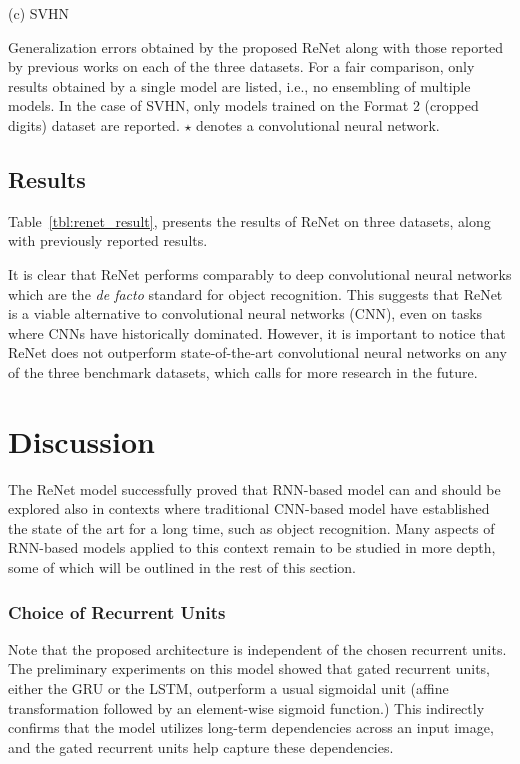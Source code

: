 \begin{table}[t]
\begin{minipage}{0.45\textwidth}
            \vspace{2mm}
            (c) SVHN
        \end{minipage}
        \hfill
        \begin{minipage}{0.51\textwidth}
            \caption{Generalization errors obtained by the proposed ReNet along
                with those reported by previous works on each of the three
                datasets. For a fair comparison, only results obtained by a
                single model are listed, i.e., no ensembling of multiple
                models. In the case of SVHN, only models trained on the Format
                2 (cropped digits) dataset are reported. $\star$ denotes a
                convolutional neural network.}
            \label{tbl:renet_result}
        \end{minipage}
    \end{table}

\subsection{Results}\label{sec:renet_results}

Table~\ref{tbl:renet_result}, presents the results of ReNet on three datasets,
along with previously reported results.

It is clear that ReNet performs comparably to deep convolutional neural
networks which are the {\it de facto} standard for object recognition. This
suggests that ReNet is a viable alternative to convolutional neural networks
(CNN), even on tasks where CNNs have historically dominated.  However, it is
important to notice that ReNet does not outperform state-of-the-art
convolutional neural networks on any of the three benchmark datasets, which
calls for more research in the future.


\section{Discussion}

The ReNet model successfully proved that RNN-based model can and should be
explored also in contexts where traditional CNN-based model have established
the state of the art for a long time, such as object recognition. Many aspects
of RNN-based models applied to this context remain to be studied in more depth,
some of which will be outlined in the rest of this section.

\subsubsection{Choice of Recurrent Units}
Note that the proposed architecture is independent of the chosen recurrent
units. The preliminary experiments on this model showed that gated recurrent
units, either the GRU or the LSTM, outperform a usual sigmoidal unit (affine
transformation followed by an element-wise sigmoid function.) This indirectly
confirms that the model utilizes long-term dependencies across an input image,
and the gated recurrent units help capture these dependencies.

